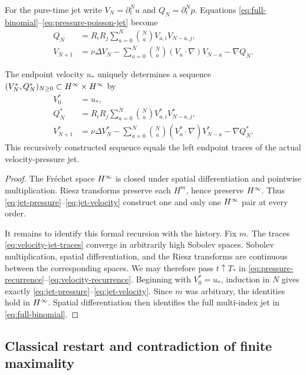 For the pure-time jet write \(V_N=\partial_t^Nu\) and
\(Q_N=\partial_t^Np\). Equations
\eqref{eq:full-binomial}--\eqref{eq:pressure-poisson-jet} become
\begin{align}
 Q_N
 &=R_iR_j\sum_{a=0}^{N}\binom Na V_{a,i}V_{N-a,j},
 \label{eq:pressure-recurrence}\\
 V_{N+1}
 &=\nu\Delta V_N
 -\sum_{a=0}^{N}\binom Na(V_a\cdot\nabla)V_{N-a}
 -\nabla Q_N.
 \label{eq:velocity-recurrence}
\end{align}

\begin{proposition}
\label{prop:endpoint-jet}
The endpoint velocity \(u_*\) uniquely determines a sequence
\((V_N^*,Q_N^*)_{N\geq0}\subset H^\infty\times H^\infty\) by
\begin{align}
 V_0^*&=u_*,
 \label{eq:jet-start}\\
 Q_N^*&=R_iR_j\sum_{a=0}^{N}\binom Na V_{a,i}^*V_{N-a,j}^*,
 \label{eq:jet-pressure}\\
 V_{N+1}^*&=\nu\Delta V_N^*
 -\sum_{a=0}^{N}\binom Na(V_a^*\cdot\nabla)V_{N-a}^*
 -\nabla Q_N^*.
 \label{eq:jet-velocity}
\end{align}
This recursively constructed sequence equals the left endpoint traces of the
actual velocity-pressure jet.
\end{proposition}

\begin{proof}
The Fr\'echet space \(H^\infty\) is closed under spatial differentiation and
pointwise multiplication. Riesz transforms preserve each \(H^m\), hence
preserve \(H^\infty\). Thus \eqref{eq:jet-pressure}--\eqref{eq:jet-velocity}
construct one and only one \(H^\infty\) pair at every order.

It remains to identify this formal recursion with the history. Fix \(m\).
The traces \eqref{eq:velocity-jet-traces} converge in arbitrarily high
Sobolev spaces. Sobolev multiplication, spatial differentiation, and the
Riesz transforms are continuous between the corresponding spaces. We may
therefore pass \(t\uparrow T_*\) in
\eqref{eq:pressure-recurrence}--\eqref{eq:velocity-recurrence}. Beginning
with \(V_0^*=u_*\), induction in \(N\) gives exactly
\eqref{eq:jet-pressure}--\eqref{eq:jet-velocity}. Since \(m\) was arbitrary,
the identities hold in \(H^\infty\). Spatial differentiation then identifies the
full multi-index jet in \eqref{eq:full-binomial}.
\end{proof}

\subsection{Classical restart and contradiction of finite maximality}

